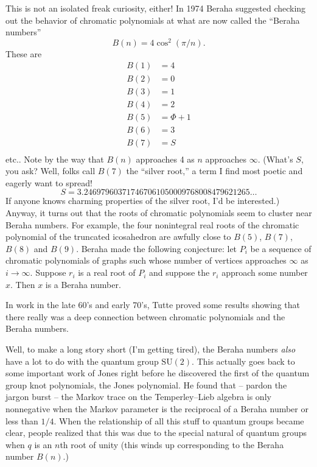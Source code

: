 \documentclass[12pt]{article}
\begin{document}
This is not an isolated freak curiosity, either! In 1974 Beraha
suggested checking out the behavior of chromatic polynomials at what are
now called the ``Beraha numbers'' \[B(n) = 4 \cos^2(\pi/n).\] These are
\[\begin{aligned}B(1) &= 4 \\ B(2) &= 0 \\ B(3) &= 1 \\ B(4) &= 2 \\ B(5) &= \Phi+1 \\ B(6) &= 3 \\ B(7) &= S \\ \end{aligned}\]
etc.. Note by the way that \(B(n)\) approaches 4 as \(n\) approaches
\(\infty\). (What's \(S\), you ask? Well, folks call \(B(7)\) the
``silver root,'' a term I find most poetic and eagerly want to spread!
\[S =  3.246979603717467061050009768008479621265\ldots\] If anyone knows
charming properties of the silver root, I'd be interested.) Anyway, it
turns out that the roots of chromatic polynomials seem to cluster near
Beraha numbers. For example, the four nonintegral real roots of the
chromatic polynomial of the truncated icosahedron are awfully close to
\(B(5)\), \(B(7)\), \(B(8)\) and \(B(9)\). Beraha made the following
conjecture: let \(P_i\) be a sequence of chromatic polynomials of graphs
such whose number of vertices approaches \(\infty\) as \(i\to\infty\).
Suppose \(r_i\) is a real root of \(P_i\) and suppose the \(r_i\)
approach some number \(x\). Then \(x\) is a Beraha number.

In work in the late 60's and early 70's, Tutte proved some results
showing that there really was a deep connection between chromatic
polynomials and the Beraha numbers.

Well, to make a long story short (I'm getting tired), the Beraha numbers
\emph{also} have a lot to do with the quantum group \(\mathrm{SU}(2)\).
This actually goes back to some important work of Jones right before he
discovered the first of the quantum group knot polynomials, the Jones
polynomial. He found that -- pardon the jargon burst -- the Markov trace
on the Temperley--Lieb algebra is only nonnegative when the Markov
parameter is the reciprocal of a Beraha number or less than \(1/4\).
When the relationship of all this stuff to quantum groups became clear,
people realized that this was due to the special natural of quantum
groups when \(q\) is an \(n\)th root of unity (this winds up
corresponding to the Beraha number \(B(n)\).)
\end{document}
